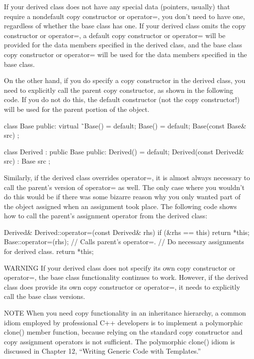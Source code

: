 If your derived class does not have any special data (pointers, usually) that require a nondefault copy constructor or operator=, you don’t need to have one, regardless of whether the base class has one. If your derived class omits the copy constructor or operator=, a default copy constructor or operator= will be provided for the data members specified in the derived class, and the base class copy constructor or operator= will be used for the data members specified in the base class.

On the other hand, if you do specify a copy constructor in the derived class, you need to explicitly call the parent copy constructor, as shown in the following code. If you do not do this, the default constructor (not the copy constructor!) will be used for the parent portion of the object.

\begin{cpp}
class Base
{
    public:
        virtual ˜Base() = default;
        Base() = default;
        Base(const Base& src) { }
};

class Derived : public Base
{
    public:
        Derived() = default;
        Derived(const Derived& src) : Base { src } { }
};
\end{cpp}

Similarly, if the derived class overrides operator=, it is almost always necessary to call the parent’s version of operator= as well. The only case where you wouldn’t do this would be if there was some bizarre reason why you only wanted part of the object assigned when an assignment took place. The following code shows how to call the parent’s assignment operator from the derived class:

\begin{cpp}
Derived& Derived::operator=(const Derived& rhs)
{
    if (&rhs == this) { return *this; }
    Base::operator=(rhs); // Calls parent's operator=.
    // Do necessary assignments for derived class.
    return *this;
}
\end{cpp}

\begin{myWarning}{WARNING}
If your derived class does not specify its own copy constructor or operator=, the base class functionality continues to work. However, if the derived class does provide its own copy constructor or operator=, it needs to explicitly call the base class versions.
\end{myWarning}


\begin{myNotic}{NOTE}
When you need copy functionality in an inheritance hierarchy, a common idiom employed by professional C++ developers is to implement a polymorphic clone() member function, because relying on the standard copy constructor and copy assignment operators is not sufficient. The polymorphic clone() idiom is discussed in Chapter 12, “Writing Generic Code with Templates.”
\end{myNotic}


